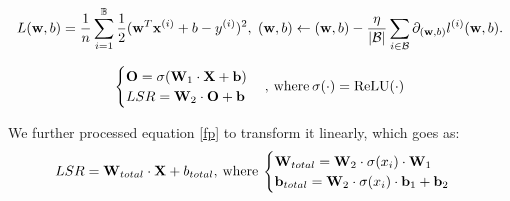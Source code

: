 \documentclass[12pt]{article}
\begin{document}
	\begin{equation}
		L(\textbf{w},b)=\frac{1}{n}\sum_{i=1}^{\mathbb{B}}\frac{1}{2}(\textbf{w}^T\textbf{x}^{(i)}+b-y^{(i)})^2,\hspace{0.3em}(\textbf{w},b)\leftarrow(\textbf{w},b)-\frac{\eta}{|\mathcal{B}|}\sum_{i\in\mathcal{B}}\partial_{(\textbf{w},b)}l^{(i)}(\textbf{w},b).
		\label{optimization}
	\end{equation}
	
	\begin{equation}
		\begin{cases}
			\textbf{O} = \sigma(\textbf{W}_1\cdot\textbf{X}+\textbf{b}) \\
			LSR = \textbf{W}_2\cdot\textbf{O} + \textbf{b}
		\end{cases},\hspace{0.2em}\text{where}\hspace{0.2em}\sigma(\cdot)=\mathrm{ReLU(\cdot)}
		\label{fp}
	\end{equation}
	
	We further processed equation \ref{fp} to transform it linearly, which goes as:
	\begin{equation}
		LSR = \textbf{W}_{total}\cdot\textbf{X}+b_{total},\hspace{0.2em}\text{where}\hspace{0.2em}\begin{cases}
			\textbf{W}_{total} = \textbf{W}_2\cdot\sigma(x_i)\cdot\textbf{W}_1 \\
			\textbf{b}_{total} = \textbf{W}_2\cdot\sigma(x_i)\cdot\textbf{b}_1 + \textbf{b}_2
		\end{cases}
	\end{equation}
	
\end{document}
